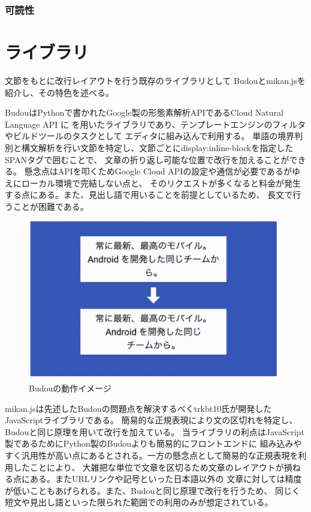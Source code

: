 \subsubsection{可読性}

\section{ライブラリ}
文節をもとに改行レイアウトを行う既存のライブラリとして
Budou\footnotemark[2]とmikan.js\footnotemark[3]を紹介し、その特色を述べる。



BudouはPythonで書かれたGoogle製の形態素解析APIであるCloud Natural Language API に
を用いたライブラリであり、テンプレートエンジンのフィルタやビルドツールのタスクとして
エディタに組み込んで利用する。
単語の境界判別と構文解析を行い文節を特定し、文節ごとにdisplay:inline-blockを指定したSPANタグで囲むことで、
文章の折り返し可能な位置で改行を加えることができる。
懸念点はAPIを叩くためGoogle Cloud APIの設定や通信が必要であるがゆえにローカル環境で完結しない点と、
そのリクエストが多くなると料金が発生する点にある。また、見出し語で用いることを前提としているため、
長文で行うことが困難である。

\begin{figure}[H]
    \centering
    \label{fig:image7}
    \includegraphics[width=0.6\columnwidth]{image/02/img2.png}
    \caption[Budouの動作イメージ] {Budouの動作イメージ\footnotemark[3]}
\end{figure}

mikan.jsは先述したBudouの問題点を解決するべくtrkbt10氏が開発したJavaScriptライブラリである。
簡易的な正規表現により文の区切れを特定し、Budouと同じ原理を用いて改行を加えている。
当ライブラリの利点はJavaScript製であるためにPython製のBudouよりも簡易的にフロントエンドに
組み込みやすく汎用性が高い点にあるとされる。一方の懸念点として簡易的な正規表現を利用したことにより、
大雑把な単位で文章を区切るため文章のレイアウトが損ねる点にある。またURLリンクや記号といった日本語以外の
文章に対しては精度が低いこともあげられる。また、Budouと同じ原理で改行を行うため、
同じく短文や見出し語といった限られた範囲での利用のみが想定されている。


